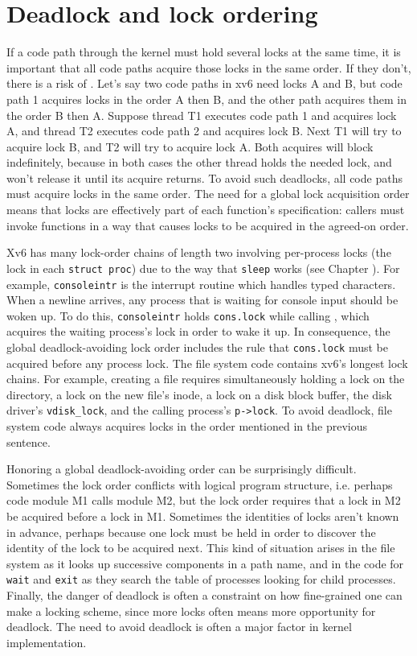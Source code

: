 \section{Deadlock and lock ordering}
If a code path through the kernel must hold several locks at the same time, it is
important that all code paths acquire those locks in the same order.  If
they don't, there is a risk of .  Let's say two code paths in
xv6 need locks A and B, but code path 1 acquires locks in the order A
then B, and the other path acquires them in the order B then A.
Suppose thread T1 executes code path 1 and acquires lock A,
and thread T2 executes code path 2 and acquires lock B.
Next T1 will try to acquire lock B, and T2 will try to acquire lock A.
Both acquires will block indefinitely, because in both cases the
other thread holds the needed lock, and won't release it until
its acquire returns.
To avoid such deadlocks, all code paths must acquire
locks in the same order. The need for a global lock acquisition order
means that locks are effectively part of each function's specification: 
callers must invoke functions in a way that causes locks to be acquired
in the agreed-on order.

Xv6 has many lock-order chains of length two involving
per-process locks
(the lock in each
\lstinline{struct proc})
due to the way that
\lstinline{sleep}
works (see Chapter
\*[CH:SCHED]).
For example,
\lstinline{consoleintr}
is the interrupt routine which handles typed characters.
When a newline arrives, any process that is waiting for
console input should be woken up.
To do this,
\lstinline{consoleintr}
holds
\lstinline{cons.lock}
while calling 
,
which acquires 
the waiting process's lock in order to wake it up.
In consequence, the global deadlock-avoiding
lock order includes the rule that
\lstinline{cons.lock}
must be acquired before any process lock.
The file system code contains xv6's longest lock chains.
For example, creating a file requires simultaneously
holding a lock on the directory, a lock on the new file's inode,
a lock on a disk block buffer, 
the disk driver's \lstinline{vdisk_lock},
and
the calling process's \lstinline{p->lock}.
To avoid deadlock, file system code always acquires locks in the order 
mentioned in the previous sentence.

Honoring a global deadlock-avoiding order can be surprisingly
difficult. Sometimes the lock order conflicts with logical program
structure, i.e. perhaps code module M1 calls module M2, but the lock
order requires that a lock in M2 be acquired before a lock in M1.
Sometimes the identities of locks aren't known in advance, perhaps
because one lock must be held in order to discover the identity
of the lock to be acquired next. This kind of situation arises in the
file system as it looks up successive components in a path name, and
in the code for {\tt wait} and {\tt exit} as they search the table of
processes looking for child processes. Finally, the danger of deadlock
is often a constraint on how fine-grained one can make a locking
scheme, since more locks often means more opportunity for deadlock.
The need to avoid deadlock is often a major factor in kernel
implementation.

